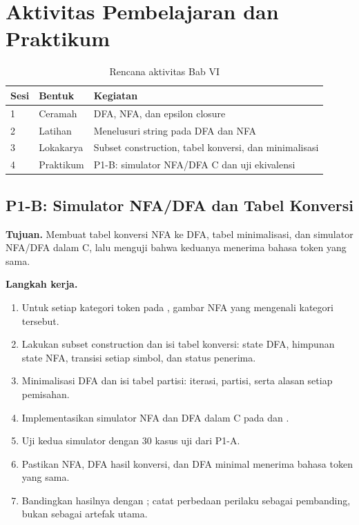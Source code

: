 \section*{Aktivitas Pembelajaran dan Praktikum}

\begin{table}[H]
\centering
\caption{Rencana aktivitas Bab VI}
\label{tab:ch06-aktivitas}
\begin{tabularx}{\textwidth}{@{}llX@{}}
\toprule
\textbf{Sesi} & \textbf{Bentuk} & \textbf{Kegiatan} \\
\midrule
1 & Ceramah & DFA, NFA, dan epsilon closure \\
2 & Latihan & Menelusuri string pada DFA dan NFA \\
3 & Lokakarya & Subset construction, tabel konversi, dan minimalisasi \\
4 & Praktikum & P1-B: simulator NFA/DFA C dan uji ekivalensi \\
\bottomrule
\end{tabularx}
\end{table}

\subsection*{P1-B: Simulator NFA/DFA dan Tabel Konversi}
\textbf{Tujuan.} Membuat tabel konversi NFA ke DFA, tabel minimalisasi,
dan simulator NFA/DFA dalam C, lalu menguji bahwa keduanya menerima
bahasa token yang sama.

\textbf{Langkah kerja.}
\begin{enumerate}[label=\arabic*.,leftmargin=*]
  \item Untuk setiap kategori token pada , gambar
        NFA yang mengenali kategori tersebut.
  \item Lakukan subset construction dan isi tabel konversi: state DFA,
        himpunan state NFA, transisi setiap simbol, dan status
        penerima.
  \item Minimalisasi DFA dan isi tabel partisi: iterasi, partisi, serta
        alasan setiap pemisahan.
  \item Implementasikan simulator NFA dan DFA dalam C pada
         dan .
  \item Uji kedua simulator dengan 30 kasus uji dari P1-A.
  \item Pastikan NFA, DFA hasil konversi, dan DFA minimal menerima
        bahasa token yang sama.
  \item Bandingkan hasilnya dengan ; catat perbedaan
        perilaku sebagai pembanding, bukan sebagai artefak utama.
\end{enumerate}

